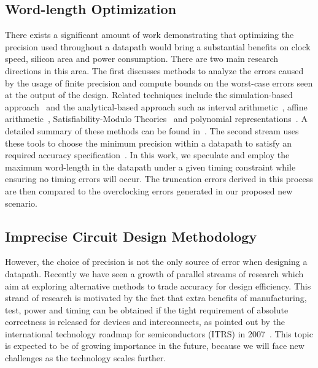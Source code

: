 \documentclass[prodmode,acmtrets]{acmsmall} %
\begin{document}
\subsection{Word-length Optimization}\label{Section_Background_WL}
There exists a significant amount of work demonstrating that optimizing the precision used throughout a datapath would bring a substantial benefits on clock speed, silicon area and power consumption. There are two main research directions in this area. The first discusses methods to analyze the errors caused by the usage of finite precision and compute bounds on the worst-case errors seen at the output of the design. Related techniques include the simulation-based approach~\cite{SungWLop_Simulation} and the analytical-based approach such as interval arithmetic~\cite{moore1966IA}, affine arithmetic~\cite{de2004affine}, Satisfiability-Modulo Theories~\cite{SAT2010} and polynomial representations~\cite{Boland2011TCAD}. A detailed summary of these methods can be found in~\cite{GeorgeDT11,lee2006accuracy}. The second stream uses these tools to choose the minimum precision within a datapath to satisfy an required accuracy specification~\cite{RoldaoWLop_Simulation}. In this work, we speculate and employ the maximum word-length in the datapath under a given timing constraint while ensuring no timing errors will occur. The truncation errors derived in this process are then compared to the overclocking errors generated in our proposed new scenario.

\subsection{Imprecise Circuit Design Methodology}\label{Section_Background_Imprecise}
However, the choice of precision is not the only source of error when designing a datapath. Recently we have seen a growth of parallel streams of research which aim at exploring alternative methods to trade accuracy for design efficiency. This strand of research is motivated by the fact that extra benefits of manufacturing, test, power and timing can be obtained if the tight requirement of absolute correctness is released for devices and interconnects, as pointed out by the international technology roadmap for semiconductors (ITRS) in 2007~\cite{semiconductor2007international}. This topic is expected to be of growing importance in the future, because we will face new challenges as the technology scales further.
\end{document}
